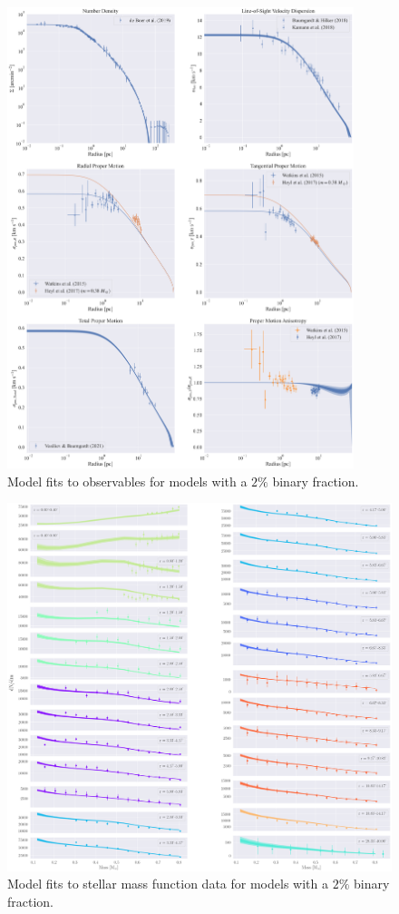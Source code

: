 \begin{figure}
	\centering
	\includegraphics[width=0.9\textwidth]{figures/low_bin_model/obs_panel.png}
	\caption{Model fits to observables for models with a $2\%$ binary fraction.}
	\label{fig:low_bin_model_obs_panel}
\end{figure}


\begin{figure}
	\centering
	\includegraphics[width=\textwidth]{figures/low_bin_model/mass_fun.png}
	\caption{Model fits to stellar mass function data for models with a $2\%$ binary fraction.}
	\label{fig:low_bin_model_mass_fun}
\end{figure}



